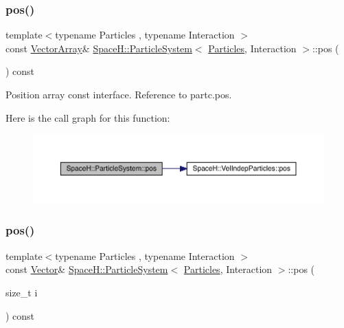 \subsubsection{\texorpdfstring{pos()}{pos()}\hspace{0.1cm}{\footnotesize\ttfamily [1/2]}}
{\footnotesize\ttfamily template$<$typename Particles , typename Interaction $>$ \\
const \mbox{\hyperlink{class_space_h_1_1_particle_system_acf48c66c8d42b85cd3a77911bb7da9ce}{Vector\+Array}}\& \mbox{\hyperlink{class_space_h_1_1_particle_system}{Space\+H\+::\+Particle\+System}}$<$ \mbox{\hyperlink{struct_space_h_1_1_particles}{Particles}}, Interaction $>$\+::pos (\begin{DoxyParamCaption}{ }\end{DoxyParamCaption}) const\hspace{0.3cm}{\ttfamily [inline]}}



Position array const interface. Reference to partc.\+pos. 

Here is the call graph for this function\+:
\nopagebreak
\begin{figure}[H]
\begin{center}
\leavevmode
\includegraphics[width=350pt]{class_space_h_1_1_particle_system_a6106365f497255a761789a37cd3f6ea6_cgraph}
\end{center}
\end{figure}
\mbox{\label{class_space_h_1_1_particle_system_a779f51e7cf5ee524f02c09329496f6f0}} 
\subsubsection{\texorpdfstring{pos()}{pos()}\hspace{0.1cm}{\footnotesize\ttfamily [2/2]}}
{\footnotesize\ttfamily template$<$typename Particles , typename Interaction $>$ \\
const \mbox{\hyperlink{class_space_h_1_1_particle_system_a7cb2705f7e4edf94131c31eda3edfded}{Vector}}\& \mbox{\hyperlink{class_space_h_1_1_particle_system}{Space\+H\+::\+Particle\+System}}$<$ \mbox{\hyperlink{struct_space_h_1_1_particles}{Particles}}, Interaction $>$\+::pos (\begin{DoxyParamCaption}\item[{size\+\_\+t}]{i }\end{DoxyParamCaption}) const\hspace{0.3cm}{\ttfamily [inline]}}



